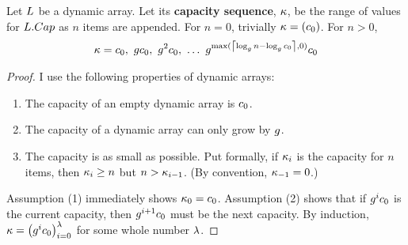 \begin{lemma}
\label{lem:CapacitySeq}
	Let $L$ be a dynamic array. Let its \textbf{capacity sequence}, $\kappa$, be the range of values for $L.Cap$ as $n$ items are appended. For $n = 0$, trivially $\kappa = (c_0)$. For $n > 0$,
	\begin{align*}
	\VarCapacitySeq = \VarInitCapacity,\ \VarGrowthFactor\VarInitCapacity,\ \VarGrowthFactor^2\VarInitCapacity,\ \ldots\ \VarGrowthFactor^{\max(\ExprMessy, 0)}\VarInitCapacity
	\end{align*}
\end{lemma}

\begin{proof}
	I use the following properties of dynamic arrays:
	\begin{enumerate}
		\item The capacity of an empty dynamic array is $c_0$.
		\item The capacity of a dynamic array can only grow by $g$.
		\item The capacity is as small as possible. Put formally, if $\kappa_i$ is the capacity for $n$ items, then $\kappa_i \geq n$ but $n > \kappa_{i - 1}$. (By convention, $\kappa_{-1} = 0$.)
	\end{enumerate}
	Assumption (1) immediately shows $\kappa_0 = c_0$. Assumption (2) shows that if $g^ic_0$ is the current capacity, then $g^{i + 1}c_0$ must be the next capacity. By induction, $\kappa = \left( g^ic_0 \right)_{i = 0}^\lambda$ for some whole number $\lambda$.
	

\end{proof}
